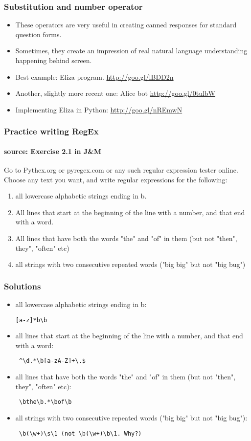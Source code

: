 \documentclass{beamer}
\begin{document}
\begin{frame}
\frametitle{Substitution and number operator}
\begin{itemize}
\item These operators are very useful in creating canned responses for standard question forms.
\item Sometimes, they create an impression of real natural language understanding happening behind screen.
\item Best example: Eliza program. \url{http://goo.gl/lBDD2n}
\item Another, slightly more recent one: Alice bot \url{http://goo.gl/0tulbW}
\item Implementing Eliza in Python: \url{http://goo.gl/nREmwN}
\end{itemize}
\end{frame}

\begin{frame} %
\frametitle{Practice writing RegEx}
\framesubtitle{source: Exercise 2.1 in J\&M}
Go to Pythex.org or pyregex.com or any such regular expression tester online. Choose any text you want, and write regular expressions for the following:
\begin{enumerate}
\item all lowercase alphabetic strings ending in b.
\item All lines that start at the beginning of the line with a number, and that end with a word. 
\item All lines that have both the words "the" and "of" in them (but not "then", they", "often" etc)
\item all strings with two consecutive repeated words ("big big" but not "big bug")
\end{enumerate}
\end{frame}

\begin{frame}[fragile]
\frametitle{Solutions}
\begin{itemize}
\item all lowercase alphabetic strings ending in b: \begin{verbatim}[a-z]*b\b \end{verbatim}
\item all lines that start at the beginning of the line with a number, and that end with a word: \begin{verbatim} ^\d.*\b[a-zA-Z]+\.$ \end{verbatim}
\item all lines that have both the words "the" and "of" in them (but not "then", they", "often" etc): \begin{verbatim} \bthe\b.*\bof\b \end{verbatim}
\item all strings with two consecutive repeated words ("big big" but not "big bug"): \begin{verbatim} \b(\w+)\s\1 (not \b(\w+)\b\1. Why?) \end{verbatim}
\end{itemize}
\end{frame}
\end{document}
